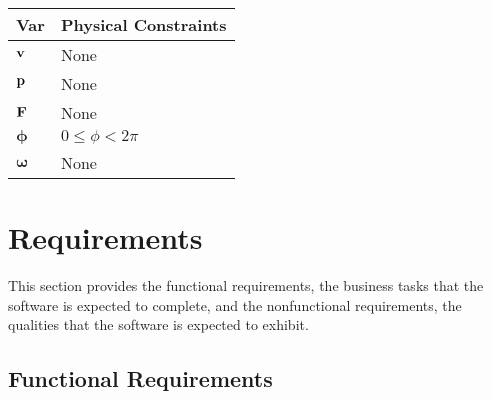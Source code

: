 \documentclass[12pt]{article}
\begin{document}
\begin{table}[!h]
\caption{Output Variables} \label{TblOutputVar}
\renewcommand{\arraystretch}{1.2}
\noindent \begin{longtable}{l l} 
  \toprule
  \textbf{Var} & \textbf{Physical Constraints} \\
  \midrule 
  $\bf v$ 		& None
  \\
  $\bf p$ 		& None
  \\
  $\bf F$		 & None
  \\
  $\boldsymbol \phi$	&$ 0 \le \phi< 2\pi $
  \\
  $\boldsymbol \omega$	& None
  \\
  \bottomrule
\end{longtable}
\end{table}

%
%

\section{Requirements}

This section provides the functional requirements, the business tasks that the
software is expected to complete, and the nonfunctional requirements, the
qualities that the software is expected to exhibit.

\subsection{Functional Requirements}
\end{document}

